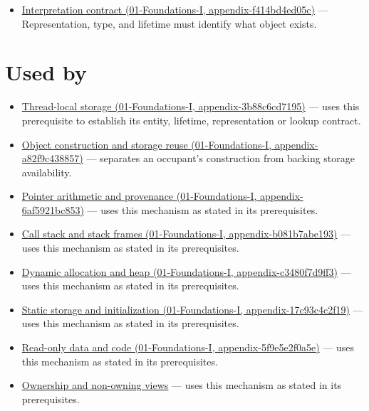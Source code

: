 \begin{itemize}
\tightlist
\item
  \href{../01-Foundations-I/main.pdf\#nameddest=appendix-f414bd4ed05c}{Interpretation contract (01-Foundations-I, appendix-f414bd4ed05c)} --- Representation, type, and lifetime must identify what object exists.
\end{itemize}

\section{Used by}\label{appendix-0b104bcba06b-used-by}

\begin{itemize}
\tightlist
\item
  \href{../01-Foundations-I/main.pdf\#nameddest=appendix-3b88c6cd7195}{Thread-local storage (01-Foundations-I, appendix-3b88c6cd7195)} --- uses this prerequisite to establish its entity, lifetime, representation or lookup contract.
\item
  \href{../01-Foundations-I/main.pdf\#nameddest=appendix-a82f9c438857}{Object construction and storage reuse (01-Foundations-I, appendix-a82f9c438857)} --- separates an occupant's construction from backing storage availability.
\item
  \href{../01-Foundations-I/main.pdf\#nameddest=appendix-6af5921bc853}{Pointer arithmetic and provenance (01-Foundations-I, appendix-6af5921bc853)} --- uses this mechanism as stated in its prerequisites.
\item
  \href{../01-Foundations-I/main.pdf\#nameddest=appendix-b081b7abe193}{Call stack and stack frames (01-Foundations-I, appendix-b081b7abe193)} --- uses this mechanism as stated in its prerequisites.
\item
  \href{../01-Foundations-I/main.pdf\#nameddest=appendix-c3480f7d9ff3}{Dynamic allocation and heap (01-Foundations-I, appendix-c3480f7d9ff3)} --- uses this mechanism as stated in its prerequisites.
\item
  \href{../01-Foundations-I/main.pdf\#nameddest=appendix-17c93c4c2f19}{Static storage and initialization (01-Foundations-I, appendix-17c93c4c2f19)} --- uses this mechanism as stated in its prerequisites.
\item
  \href{../01-Foundations-I/main.pdf\#nameddest=appendix-5f9e5e2f0a5e}{Read-only data and code (01-Foundations-I, appendix-5f9e5e2f0a5e)} --- uses this mechanism as stated in its prerequisites.
\item
  \hyperref[appendix-d52e4486f527]{Ownership and non-owning views} --- uses this mechanism as stated in its prerequisites.

\end{itemize}
